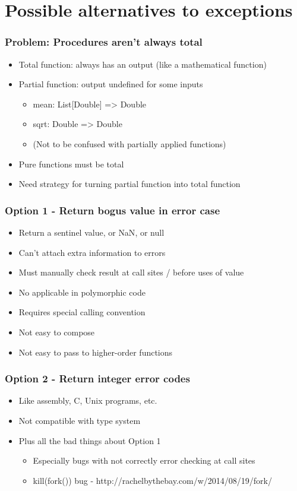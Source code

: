 \documentclass{beamer}
\begin{document}
\section{Possible alternatives to exceptions}

\begin{frame}
  \frametitle{Problem: Procedures aren't always total}
  \begin{itemize}
    \item Total function: always has an output (like a mathematical function)
    \item Partial function: output undefined for some inputs
      \begin{itemize}
        \item {\ttfamily mean: List[Double] => Double}
        \item {\ttfamily sqrt: Double => Double}
        \item {\tiny (Not to be confused with partially applied functions)}
      \end{itemize}
    \item Pure functions must be total
    \item Need strategy for turning partial function into total function
  \end{itemize}
\end{frame}

\begin{frame}
  \frametitle{Option 1 - Return bogus value in error case}
  \begin{itemize}
    \item Return a sentinel value, or {\ttfamily NaN}, or {\ttfamily null}
    \item Can't attach extra information to errors
    \item Must manually check result at call sites / before uses of value
    \item No applicable in polymorphic code
    \item Requires special calling convention
    \item Not easy to compose
    \item Not easy to pass to higher-order functions
  \end{itemize}
\end{frame}

\begin{frame}
  \frametitle{Option 2 - Return integer error codes}
  \begin{itemize}
    \item Like assembly, C, Unix programs, etc.
    \item Not compatible with type system
    \item Plus all the bad things about Option 1
      \begin{itemize}
        \item Especially bugs with not correctly error checking at call sites
        \item {\ttfamily kill(fork())} bug - http://rachelbythebay.com/w/2014/08/19/fork/
      \end{itemize}
  \end{itemize}
\end{frame}
\end{document}
